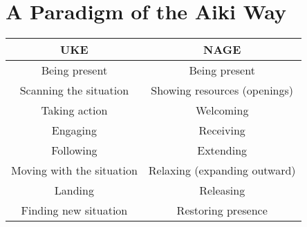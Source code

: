 \chapter[A Paradigm of the Aiki Way (2010)]{A Paradigm of the Aiki Way}
\begin{center}
\begin{tabular}{|c|c|}
\hline
\large\bfseries\uppercase{Uke} & \large\bfseries\uppercase{Nage} \\
\hline
Being present & Being present \\
\hline
Scanning the situation & Showing resources (openings) \\
\hline
Taking action & Welcoming \\
\hline
Engaging & Receiving \\
\hline
Following & Extending \\
\hline
Moving with the situation & Relaxing (expanding outward) \\
\hline
Landing & Releasing \\
\hline
Finding new situation & Restoring presence \\
\hline
\end{tabular}
\end{center}